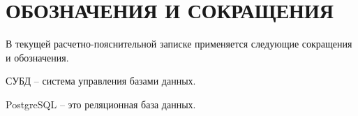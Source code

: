 \chapter*{\hfill{\centering ОБОЗНАЧЕНИЯ И СОКРАЩЕНИЯ}\hfill}

В текущей расчетно-пояснительной записке применяется следующие сокращения и обозначения.

\begin{description}[leftmargin=0pt]
	\item \noindent СУБД -- система управления базами данных.
	\item \noindent PostgreSQL -- это реляционная база данных. 
\end{description}